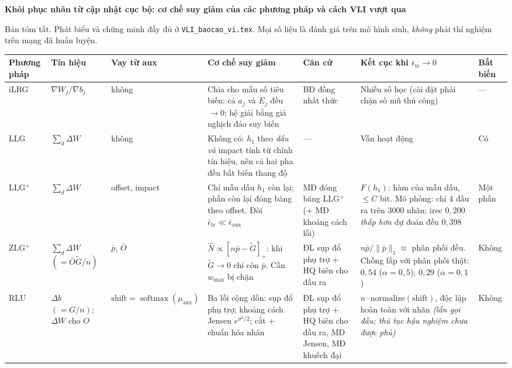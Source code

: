 \documentclass[11pt]{article}
\DeclareMathOperator{\softmaxop}{softmax}
\newcommand{\pos}[1]{\left[#1\right]_+}
\begin{document}
\pagestyle{empty}

\begin{center}
{\large\bfseries Khôi phục nhãn từ cập nhật cục bộ: cơ chế suy giảm của các
phương pháp và cách VLI vượt qua}

\vspace{0.3em}
\footnotesize
Bản tóm tắt. Phát biểu và chứng minh đầy đủ ở \texttt{VLI\_baocao\_vi.tex}.
Mọi số liệu là đánh giá trên mô hình sinh, \emph{không} phải thí nghiệm trên
mạng đã huấn luyện.
\end{center}

\vspace{0.4em}

\footnotesize
\noindent
\begin{tabular}{@{}l p{2.1cm} p{2.0cm} p{5.4cm} p{2.7cm} p{5.4cm} p{1.3cm}@{}}
\toprule
\textbf{Phương pháp} &
\textbf{Tín hiệu} &
\textbf{Vay từ aux} &
\textbf{Cơ chế suy giảm} &
\textbf{Căn cứ} &
\textbf{Kết cục khi $\bar\epsilon_{\text{tr}}\to0$} &
\textbf{Bất biến} \\
\midrule

iLRG &
$\nabla W_j/\nabla b_j$ &
không &
Chia cho mẫu số tiêu biến: cả $a_j$ và $E_j$ đều $\to0$; hệ giải bằng giả
nghịch đảo suy biến &
BĐ đồng nhất thức &
Nhiễu số học (cài đặt phải chặn số mũ thủ công) &
--- \\

LLG &
$\sum_d \Delta W$ &
không &
Không có: $h_1$ theo \emph{dấu} \emph{và} impact tính từ chính tín hiệu, nên
cả hai pha đều bất biến thang độ &
--- &
Vẫn hoạt động &
Có \\

LLG$^+$ &
$\sum_d \Delta W$ &
offset, impact &
Chỉ mẫu dấu $h_1$ còn lại; phần còn lại đóng băng theo offset. Đòi
$\bar\epsilon_{\text{tr}}\ll\bar\epsilon_{\text{aux}}$ &
MĐ đóng băng LLG$^+$ (+ MĐ khoảng cách lỗi) &
$F(h_1)$: hàm của mẫu dấu, $\le C$ bit. Mô phỏng: chỉ $4$ đầu ra trên $3000$
nhãn; irec $0{,}200$ \emph{thấp hơn} dự đoán đều $0{,}398$ &
Một phần \\

ZLG$^+$ &
$\sum_d \Delta W$ $(=\bar O\tilde G/n)$ &
$\bar p$, $\bar O$ &
$\widehat N\propto\pos{n\bar p-\tilde G}$: khi $\tilde G\to0$ chỉ còn
$\bar p$. Cần $w_{\max}$ bị chặn &
ĐL sụp đổ phụ trợ + HQ biên cho đầu ra &
$n\bar p/\|\bar p\|_1\approx$ phân phối đều. Chồng lấp với phân phối thật:
$0{,}54$ ($\alpha{=}0{,}5$); $0{,}29$ ($\alpha{=}0{,}1$) &
Không \\

RLU &
$\Delta b$ $(=G/n)$; $\Delta W$ cho $O$ &
$\text{shift}=\softmaxop(\mu_{\text{aux}})$ &
Ba lỗi cộng dồn: sụp đổ phụ trợ; khoảng cách Jensen $e^{\sigma^2/2}$;
cắt + chuẩn hóa nhân &
ĐL sụp đổ phụ trợ + HQ biên cho đầu ra, MĐ Jensen, MĐ khuếch đại &
$n\cdot\text{normalize}(\text{shift})$, độc lập hoàn toàn với nhãn
\emph{(lần gọi đầu; thủ tục hậu nghiệm chưa được phủ)} &
Không \\


\end{tabular}
\end{document}
